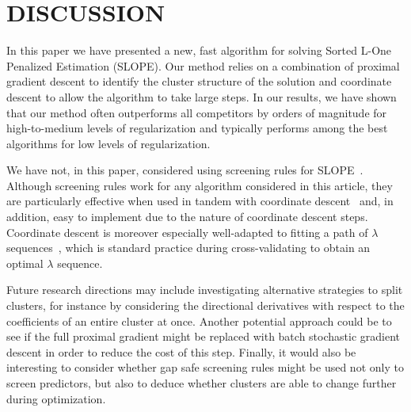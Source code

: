 \section{DISCUSSION}\label{sec:discussion}

In this paper we have presented a new, fast algorithm for solving Sorted L-One Penalized Estimation (SLOPE).
Our method relies on a combination of proximal gradient descent to identify the cluster structure of the solution and coordinate descent to allow the algorithm to take large steps.
In our results, we have shown that our method often outperforms all competitors by orders of magnitude for high-to-medium levels of regularization and typically performs among the best algorithms for low levels of regularization.

We have not, in this paper, considered using screening rules for SLOPE~\parencite{larsson2020c,elvira2022}.
Although screening rules work for any algorithm considered in this article, they are particularly effective when used in tandem with coordinate descent~\parencite{fercoq2015} and, in addition, easy to implement due to the nature of coordinate descent steps.
Coordinate descent is moreover especially well-adapted to fitting a path of \(\lambda\) sequences~\parencite{friedman2007,friedman2010}, which is standard practice during cross-validating to obtain an optimal \(\lambda\) sequence.

Future research directions may include investigating alternative strategies to split clusters, for instance by considering the directional derivatives with respect to the coefficients of an entire cluster at once.
Another potential approach could be to see if the full proximal gradient might be replaced with batch stochastic gradient descent in order to reduce the cost of this step.
Finally, it would also be interesting to consider whether gap safe screening rules might be used not only to screen predictors, but also to deduce whether clusters are able to change further during optimization.

